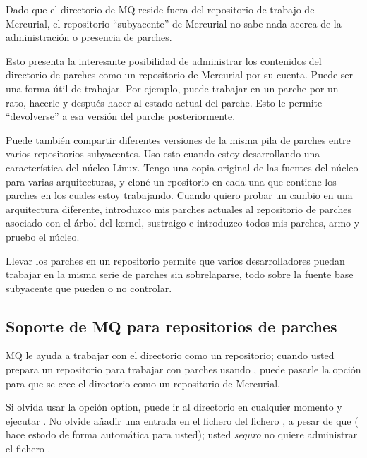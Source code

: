 Dado que el directorio  de MQ reside fuera del
repositorio de trabajo de Mercurial, el repositorio ``subyacente'' de
Mercurial no sabe nada acerca de la administración o presencia de
parches.

Esto presenta la interesante posibilidad de administrar los contenidos
del directorio de parches como un repositorio de Mercurial por su
cuenta.  Puede ser una forma útil de trabajar.  Por ejemplo, puede
trabajar en un parche por un rato, hacerle  y
después hacer  al estado actual del parche.  Esto le
permite ``devolverse'' a esa versión del parche posteriormente.

Puede también compartir diferentes versiones de la misma pila de
parches entre varios repositorios subyacentes.  Uso esto cuando estoy
desarrollando una característica del núcleo Linux.  Tengo una copia
original de las fuentes del núcleo para varias arquitecturas, y cloné
un rpositorio en cada una que contiene los parches en los cuales
estoy trabajando.  Cuando quiero probar un cambio en una arquitectura
diferente, introduzco mis parches actuales al repositorio de parches
asociado con el árbol del kernel, sustraigo e introduzco todos mis
parches, armo y pruebo el núcleo.

Llevar los parches en un repositorio permite que varios
desarrolladores puedan trabajar en la misma serie de parches sin
sobrelaparse, todo sobre la fuente base subyacente que pueden o no
controlar.

\subsection{Soporte de MQ para repositorios de parches}

MQ le ayuda a trabajar con el directorio  como
un repositorio; cuando usted prepara un repositorio para trabajar con
parches usando , puede pasarle la opción
 para que se cree el directorio
 como un repositorio de Mercurial.

\begin{note}
  Si olvida usar la opción  option, puede ir al
  directorio  en cualquier momento y ejecutar
  .  No olvide añadir una entrada en el fichero
   del fichero , a pesar de que
  ( hace estodo de forma
  automática para usted); usted \emph{seguro} no quiere administrar el
  fichero  .
\end{note}

